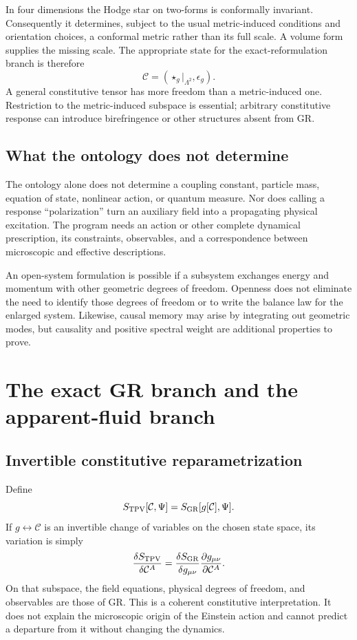 \documentclass[11pt,oneside]{report}
\begin{document}
In four dimensions the Hodge star on two-forms is conformally invariant. Consequently it determines, subject to the usual metric-induced conditions and orientation choices, a conformal metric rather than its full scale. A volume form supplies the missing scale. The appropriate state for the exact-reformulation branch is therefore
\begin{equation}
\mathcal C=(\star_g|_{\Lambda^2},\epsilon_g).
\end{equation}
A general constitutive tensor has more freedom than a metric-induced one. Restriction to the metric-induced subspace is essential; arbitrary constitutive response can introduce birefringence or other structures absent from GR.

\section{What the ontology does not determine}
The ontology alone does not determine a coupling constant, particle mass, equation of state, nonlinear action, or quantum measure. Nor does calling a response ``polarization'' turn an auxiliary field into a propagating physical excitation. The program needs an action or other complete dynamical prescription, its constraints, observables, and a correspondence between microscopic and effective descriptions.

An open-system formulation is possible if a subsystem exchanges energy and momentum with other geometric degrees of freedom. Openness does not eliminate the need to identify those degrees of freedom or to write the balance law for the enlarged system. Likewise, causal memory may arise by integrating out geometric modes, but causality and positive spectral weight are additional properties to prove.

\chapter{The exact GR branch and the apparent-fluid branch}
\section{Invertible constitutive reparametrization}
Define
\begin{equation}
S_{\rm TPV}[\mathcal C,\Psi]=S_{\rm GR}[g[\mathcal C],\Psi].
\end{equation}
If $g\leftrightarrow\mathcal C$ is an invertible change of variables on the chosen state space, its variation is simply
\begin{equation}
\frac{\delta S_{\rm TPV}}{\delta\mathcal C^A}
=\frac{\delta S_{\rm GR}}{\delta g_{\mu\nu}}
\frac{\partial g_{\mu\nu}}{\partial\mathcal C^A}.
\end{equation}
On that subspace, the field equations, physical degrees of freedom, and observables are those of GR. This is a coherent constitutive interpretation. It does not explain the microscopic origin of the Einstein action and cannot predict a departure from it without changing the dynamics.
\end{document}
